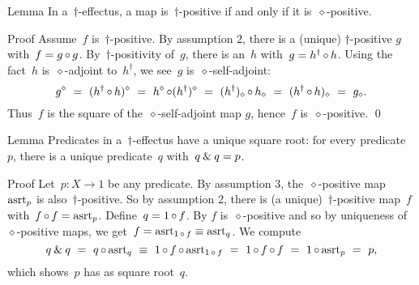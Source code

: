 \documentclass[b]{subfiles}
\begin{document}
\begin{parsec}%
\begin{point}{Lemma}%
In a~$\dagger$-effectus,
    a map is~$\dagger$-positive if and only if it is~$\diamond$-positive.
\begin{point}{Proof}%
Assume~$f$ is~$\dagger$-positive.
By assumption 2, there is a (unique) $\dagger$-positive
    $g$ with~$f = g \mathop{\circ} g$.
By~$\dagger$-positivity of~$g$,
    there is an~$h$ with~$g = h^\dagger \mathop{\circ} h$.
Using the fact~$h$ is~$\diamond$-adjoint
    to~$h^\dagger$, we see~$g$ is~$\diamond$-self-adjoint:
\begin{equation*}
    g^\diamond
    \ =\  (h^\dagger \mathop{\circ} h)^\diamond
    \ =\  h^\diamond \mathop{\circ} (h^\dagger)^\diamond 
    \ =\  (h^\dagger)_\diamond \mathop{\circ} h_\diamond 
    \ =\  (h^\dagger\mathop{\circ} h)_\diamond
    \ =\  g_\diamond.
\end{equation*}
Thus~$f$ is the square of the~$\diamond$-self-adjoint map $g$,
    hence~$f$ is~$\diamond$-positive. \qed
\end{point}
\end{point}

\begin{point}{Lemma}%
Predicates in a~$\dagger$-effectus have a unique square root:
    for every predicate~$p$,
    there is a unique predicate~$q$
    with~$q \mathbin{\&} q=p$.
\begin{point}{Proof}%
Let~$p\colon X \to 1$ be any predicate.
By assumption 3,
    the~$\diamond$-positive map~$\mathrm{asrt}_p$
        is also~$\dagger$-positive.
So by assumption 2,
    there is (a unique)~$\dagger$-positive map~$f$
    with~$f \mathop{\circ} f = \mathrm{asrt}_p$.
Define~$q = 1 \mathop{\circ} f$.
By 
    $f$ is~$\diamond$-positive
    and so by uniqueness of~$\diamond$-positive maps,
    we get~$f = \mathrm{asrt}_{1\mathop{\circ} f} \equiv \mathrm{asrt}_q$.
We compute
\begin{equation*}
    \andthen{q}{q}
        \ =\    
        q \after \asrt_q \ \equiv \ 
        1 \after f \after \asrt_{1 \after f} \ = \ 
        1 \after f \after f \ = \ 1 \after \asrt_p \ = \ p,
\end{equation*}
which shows~$p$ has as square root~$q$.


\end{point}
\end{point}
\end{parsec}
\end{document}
